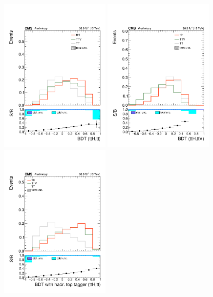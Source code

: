 \begin{figure}[htp]
\centering
\includegraphics[width=0.49\textwidth]{ch8_figs/kinMVA_2lss_ttbar.pdf}
\includegraphics[width=0.49\textwidth]{ch8_figs/kinMVA_2lss_ttV.pdf}\\
\includegraphics[width=0.49\textwidth]{ch8_figs/kinMVA_2lss_ttbar_withBDTv8.pdf}

\end{figure}
